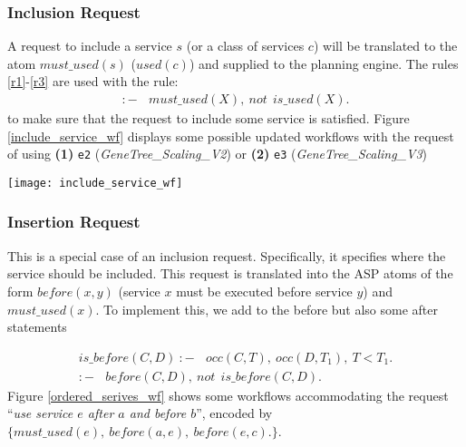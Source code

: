 \documentclass{new_tlp}
\begin{document}
{\subsubsection{Inclusion Request} 
A request to include a service $s$ (or a class of services $c$) will be translated to the atom $must\_used(s)$ 
($used(c)$) and supplied to the planning engine. The rules \eqref{r1}-\eqref{r3}  are used with  
the rule:  
%
%
\begin{align} 
  {:}{-} \:\:\:\: must\_used(X), \: not \:\: is\_used(X).  \label{r4}
\end{align} 
to make sure that the request to include some service is satisfied.  
Figure \ref{include_service_wf} displays some possible updated workflows with the request of using \textbf{(1)} \texttt{\small e2} (\emph{GeneTree\_Scaling\_V2}) 
or  \textbf{(2)} \texttt{\small e3} (\emph{GeneTree\_Scaling\_V3})
%
\begin{figure*}[h]
		\centerline{\texttt{[image: include\_service\_wf]}}
	\caption{Updated workflows with inclusion request of \texttt{\small e2} or \texttt{\small e3}}
	\label{include_service_wf}
\end{figure*}
%
\subsubsection{Insertion Request} 
This is a special case of an inclusion request. Specifically, it specifies where the service should be included. This request is translated into the ASP atoms of the form $before(x,y)$ (service $x$ must be executed before service $y$) and $must\_used(x)$. To implement this, we add to the 
%
before but also some after statements}
\begin{align}
  is\_before(C,D)\: {:}{-} \:\:\:\:  occ(C,T), \: occ(D,T_1), \: T<T_1. \label{r5} \\
  {:}{-} \:\:\:\: before(C,D), \: not \: \: is\_before(C,D). \label{r6} 
\end{align} 
Figure \ref{ordered_serives_wf} shows some workflows accommodating the request ``\emph{use service $e$ after $a$ and before $b$}'', encoded by
$ \{must\_used(e), \:  before(a,e), \: before(e,c).\}$.   
\end{document}
